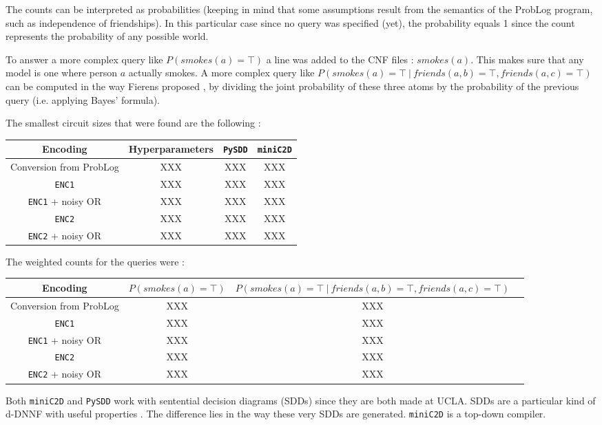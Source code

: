 \begin{multicols*}{2}
\noindent The counts can be interpreted as probabilities (keeping in mind that some assumptions result from the semantics of the ProbLog program, such as independence of friendships). In this particular case since no query was specified (yet), the probability equals 1 since the count represents the probability of any possible world.\\

\par\noindent To answer a more complex query like $P(smokes(a)=\top)$ a line was added to the CNF files : $smokes(a)$.  This makes sure that any model is one where person $a$ actually smokes. A more complex query like $P(smokes(a)=\top\ |\ friends(a,b)=\top,friends(a,c)=\top)$ can be computed in the way Fierens proposed \cite{fierens}, by dividing the joint probability of these three atoms by the probability of the previous query (i.e. applying Bayes' formula).

\end{multicols*}

\par\noindent The smallest circuit sizes that were found are the following : 
\begin{center}
\begin{tabular}{cc|cc}
Encoding & Hyperparameters & \texttt{PySDD} & \texttt{miniC2D} \\\hline
Conversion from ProbLog & XXX & XXX & XXX\\
\texttt{ENC1} & XXX & XXX & XXX\\
\texttt{ENC1} + noisy OR & XXX & XXX & XXX\\
\texttt{ENC2} & XXX & XXX & XXX\\
\texttt{ENC2} + noisy OR & XXX & XXX & XXX\\
\end{tabular}
\end{center}

\par\noindent The weighted counts for the queries were :

\begin{center}
\begin{tabular}{cc|cc}
Encoding & $P(smokes(a)=\top)$ & $P(smokes(a)=\top\ |\ friends(a,b)=\top,friends(a,c)=\top)$ \\\hline
Conversion from ProbLog & XXX & XXX\\
\texttt{ENC1} & XXX & XXX\\
\texttt{ENC1} + noisy OR & XXX & XXX\\
\texttt{ENC2} & XXX & XXX\\
\texttt{ENC2} + noisy OR & XXX & XXX\\
\end{tabular}
\end{center}

\par\noindent Both \texttt{miniC2D} and \texttt{PySDD} work with sentential decision diagrams (SDDs) since they are both made at UCLA. SDDs are a particular kind of d-DNNF with useful properties \cite{youtube}. The difference lies in the way these very SDDs are generated. \texttt{miniC2D} is a top-down compiler.
